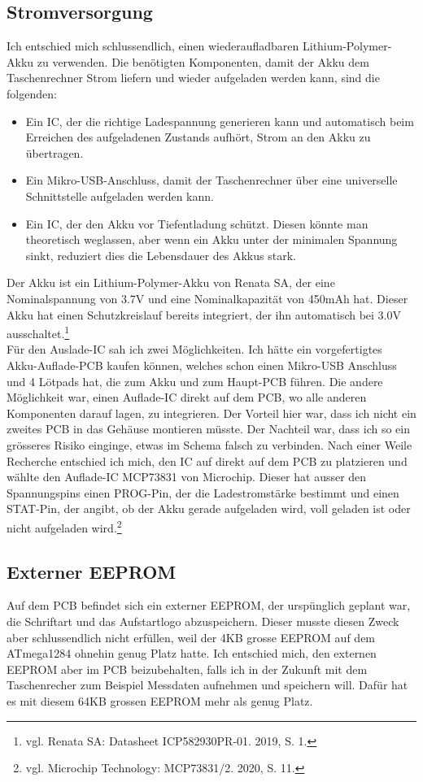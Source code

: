 \documentclass[12pt, a4paper]{report}
\begin{document}
\subsection{Stromversorgung}
Ich entschied mich schlussendlich, einen wiederaufladbaren Lithium-Polymer-Akku zu verwenden. Die benötigten Komponenten, damit der Akku dem Taschenrechner Strom liefern und wieder aufgeladen werden kann, sind die folgenden:
\begin{itemize}
	\item Ein IC, der die richtige Ladespannung generieren kann und automatisch beim Erreichen des aufgeladenen Zustands aufhört, Strom an den Akku zu übertragen.
	\item Ein Mikro-USB-Anschluss, damit der Taschenrechner über eine universelle Schnittstelle aufgeladen werden kann.
	\item Ein IC, der den Akku vor Tiefentladung schützt. Diesen könnte man theoretisch weglassen, aber wenn ein Akku unter der minimalen Spannung sinkt, reduziert dies die Lebensdauer des Akkus stark.
\end{itemize}
Der Akku ist ein Lithium-Polymer-Akku von Renata SA, der eine Nominalspannung von 3.7V und eine Nominalkapazität von 450mAh hat. Dieser Akku hat einen Schutzkreislauf bereits integriert, der ihn automatisch bei 3.0V ausschaltet.\footnote{vgl. Renata SA: Datasheet ICP582930PR-01. 2019, S. 1.}
\\[\medskipamount]
Für den Auslade-IC sah ich zwei Möglichkeiten. Ich hätte ein vorgefertigtes Akku-Auflade-PCB kaufen können, welches schon einen Mikro-USB Anschluss und 4 Lötpads hat, die zum Akku und zum Haupt-PCB führen. Die andere Möglichkeit war, einen Auflade-IC direkt auf dem PCB, wo alle anderen Komponenten darauf lagen, zu integrieren. Der Vorteil hier war, dass ich nicht ein zweites PCB in das Gehäuse montieren müsste. Der Nachteil war, dass ich so ein grösseres Risiko einginge, etwas im Schema falsch zu verbinden. Nach einer Weile Recherche entschied ich mich, den IC auf direkt auf dem PCB zu platzieren und wählte den Auflade-IC MCP73831 von Microchip. Dieser hat ausser den Spannungspins einen PROG-Pin, der die Ladestromstärke bestimmt und einen STAT-Pin, der angibt, ob der Akku gerade aufgeladen wird, voll geladen ist oder nicht aufgeladen wird.\footnote{vgl. Microchip Technology: MCP73831/2. 2020, S. 11.}
\subsection{Externer EEPROM}
Auf dem PCB befindet sich ein externer EEPROM, der urspünglich geplant war, die Schriftart und das Aufstartlogo abzuspeichern. Dieser musste diesen Zweck aber schlussendlich nicht erfüllen, weil der 4KB grosse EEPROM auf dem ATmega1284 ohnehin genug Platz hatte. Ich entschied mich, den externen EEPROM aber im PCB beizubehalten, falls ich in der Zukunft mit dem Taschenrecher zum Beispiel Messdaten aufnehmen und speichern will. Dafür hat es mit diesem 64KB grossen EEPROM mehr als genug Platz.
\end{document}
